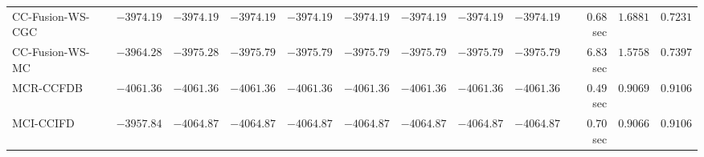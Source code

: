 \begin{table}[H]
\begin{tabular}{lrrrrrrrrrrr}
    CC-Fusion-WS-CGC & $     -3974.19$ & $     -3974.19$ & $     -3974.19$ & $     -3974.19$ & $     -3974.19$ & $     -3974.19$ & $     -3974.19$ & $     -3974.19$ & $         0.68$ sec    & $       1.6881$  & $       0.7231$ \\ 
     CC-Fusion-WS-MC & $     -3964.28$ & $     -3975.28$ & $     -3975.79$ & $     -3975.79$ & $     -3975.79$ & $     -3975.79$ & $     -3975.79$ & $     -3975.79$ & $         6.83$ sec    & $       1.5758$  & $       0.7397$ \\ 
\cmidrule{1-1} 
           MCR-CCFDB & $     -4061.36$ & $     -4061.36$ & $     -4061.36$ & $     -4061.36$ & $     -4061.36$ & $     -4061.36$ & $     -4061.36$ & $     -4061.36$ & $         0.49$ sec    & $       0.9069$  & $       0.9106$ \\ 
\cmidrule{1-1} 
           MCI-CCIFD & $     -3957.84$ & $     -4064.87$ & $     -4064.87$ & $     -4064.87$ & $     -4064.87$ & $     -4064.87$ & $     -4064.87$ & $     -4064.87$ & $         0.70$ sec    & $       0.9066$  & $       0.9106$ \\ 
\bottomrule
\end{tabular}
\end{table}

